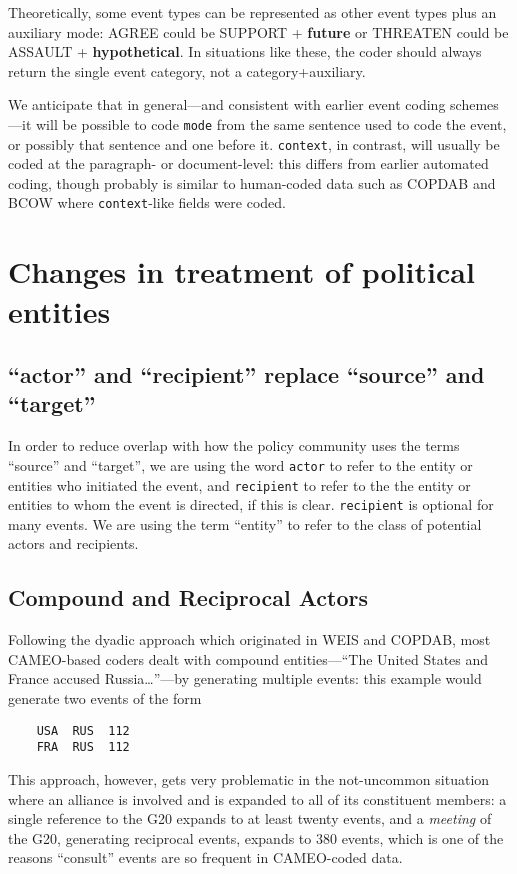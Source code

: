\documentclass[11pt]{report}
\newcommand{\plcat}[1]{\textsf{#1}}
\newcommand{\plcon}[1]{\textbf{#1}}
\newcommand{\txt}[1]{\texttt{#1}}
\begin{document}
Theoretically, some event types can be represented as other event types plus an auxiliary mode: \plcat{AGREE} could be  \plcat{SUPPORT} + \plcon{future} or \plcat{THREATEN} could be \plcat{ASSAULT} + \plcon{hypothetical}. In situations like these, the coder should always return the single event category, not a category+auxiliary.

We anticipate that in general---and consistent with earlier event coding schemes---it will be possible to code \txt{mode} from the same sentence used to code the event, or possibly that sentence and one before it. \txt{context}, in contrast, will usually be coded at the paragraph- or document-level: this differs from earlier automated coding, though probably is similar to human-coded data such as COPDAB and BCOW \citep{Leng87} where \txt{context}-like fields were coded.


\section{Changes in treatment of political entities}\label{ssec:change}

\subsection{``actor'' and ``recipient'' replace ``source'' and ``target''}

In order to reduce overlap with how the policy community uses the terms  ``source'' and ``target'', we are using the word \txt{actor} to refer to the entity or entities who initiated the event, and \txt{recipient} to refer to the 
 the entity or entities to whom the event is directed, if this is clear. \txt{recipient} is optional for many events. We are using the term ``entity'' to refer to the class of potential actors and recipients.

\subsection{Compound and Reciprocal Actors}\label{sec:recip}

Following the dyadic approach which originated in WEIS and COPDAB,  most CAMEO-based coders dealt with compound entities---``The United States and France accused Russia\ldots''---by generating multiple events: this example would generate two events of the form
\begin{verbatim}
	USA  RUS  112
	FRA  RUS  112
\end{verbatim}
This approach, however, gets very problematic in the not-uncommon situation where an alliance is involved and is expanded to all of its constituent members: a single reference to the G20 expands to at least twenty events, and a \textit{meeting} of the G20, generating reciprocal events, expands to 380 events, which is one of the reasons ``consult'' events are so frequent in CAMEO-coded data.
\end{document}

